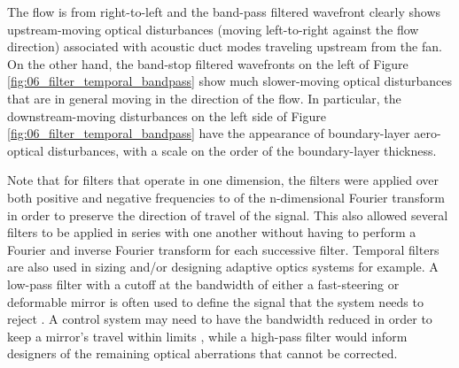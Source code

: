The flow is from right-to-left and the band-pass filtered wavefront clearly shows upstream-moving optical disturbances (moving left-to-right against the flow direction) associated with acoustic duct modes traveling upstream from the fan.
On the other hand, the band-stop filtered wavefronts on the left of Figure \ref{fig:06_filter_temporal_bandpass} show much slower-moving optical disturbances that are in general moving in the direction of the flow.
In particular, the downstream-moving disturbances on the left side of Figure \ref{fig:06_filter_temporal_bandpass} have the appearance of boundary-layer aero-optical disturbances, with a scale on the order of the boundary-layer thickness.

Note that for filters that operate in one dimension, the filters were applied over both positive and negative frequencies to of the n-dimensional Fourier transform in order to preserve the direction of travel of the signal.
This also allowed several filters to be applied in series with one another without having to perform a Fourier and inverse Fourier transform for each successive filter.
Temporal filters are also used in sizing and/or designing adaptive optics systems \cite{Greenwood-1977-aWDqUh6C} for example.
A low-pass filter with a cutoff at the bandwidth of either a fast-steering or deformable mirror is often used to define the signal that the system needs to reject \cite{Whiteley-2007-bHbWRWUu}.
A control system may need to have the bandwidth reduced in order to keep a mirror’s travel within limits \cite{Madec-2012-YJ8eWhPB}, while a high-pass filter would inform designers of the remaining optical aberrations that cannot be corrected.

